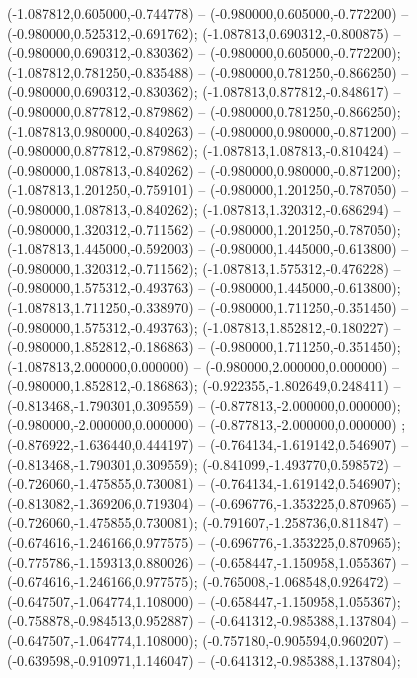  (-1.087812,0.605000,-0.744778) -- (-0.980000,0.605000,-0.772200) -- (-0.980000,0.525312,-0.691762);
 (-1.087813,0.690312,-0.800875) -- (-0.980000,0.690312,-0.830362) -- (-0.980000,0.605000,-0.772200);
 (-1.087812,0.781250,-0.835488) -- (-0.980000,0.781250,-0.866250) -- (-0.980000,0.690312,-0.830362);
 (-1.087813,0.877812,-0.848617) -- (-0.980000,0.877812,-0.879862) -- (-0.980000,0.781250,-0.866250);
 (-1.087813,0.980000,-0.840263) -- (-0.980000,0.980000,-0.871200) -- (-0.980000,0.877812,-0.879862);
 (-1.087813,1.087813,-0.810424) -- (-0.980000,1.087813,-0.840262) -- (-0.980000,0.980000,-0.871200);
 (-1.087813,1.201250,-0.759101) -- (-0.980000,1.201250,-0.787050) -- (-0.980000,1.087813,-0.840262);
 (-1.087813,1.320312,-0.686294) -- (-0.980000,1.320312,-0.711562) -- (-0.980000,1.201250,-0.787050);
 (-1.087813,1.445000,-0.592003) -- (-0.980000,1.445000,-0.613800) -- (-0.980000,1.320312,-0.711562);
 (-1.087813,1.575312,-0.476228) -- (-0.980000,1.575312,-0.493763) -- (-0.980000,1.445000,-0.613800);
 (-1.087813,1.711250,-0.338970) -- (-0.980000,1.711250,-0.351450) -- (-0.980000,1.575312,-0.493763);
 (-1.087813,1.852812,-0.180227) -- (-0.980000,1.852812,-0.186863) -- (-0.980000,1.711250,-0.351450);
 (-1.087813,2.000000,0.000000) -- (-0.980000,2.000000,0.000000) -- (-0.980000,1.852812,-0.186863);
 (-0.922355,-1.802649,0.248411) -- (-0.813468,-1.790301,0.309559) -- (-0.877813,-2.000000,0.000000);
 (-0.980000,-2.000000,0.000000) -- (-0.877813,-2.000000,0.000000) ;
 (-0.876922,-1.636440,0.444197) -- (-0.764134,-1.619142,0.546907) -- (-0.813468,-1.790301,0.309559);
 (-0.841099,-1.493770,0.598572) -- (-0.726060,-1.475855,0.730081) -- (-0.764134,-1.619142,0.546907);
 (-0.813082,-1.369206,0.719304) -- (-0.696776,-1.353225,0.870965) -- (-0.726060,-1.475855,0.730081);
 (-0.791607,-1.258736,0.811847) -- (-0.674616,-1.246166,0.977575) -- (-0.696776,-1.353225,0.870965);
 (-0.775786,-1.159313,0.880026) -- (-0.658447,-1.150958,1.055367) -- (-0.674616,-1.246166,0.977575);
 (-0.765008,-1.068548,0.926472) -- (-0.647507,-1.064774,1.108000) -- (-0.658447,-1.150958,1.055367);
 (-0.758878,-0.984513,0.952887) -- (-0.641312,-0.985388,1.137804) -- (-0.647507,-1.064774,1.108000);
 (-0.757180,-0.905594,0.960207) -- (-0.639598,-0.910971,1.146047) -- (-0.641312,-0.985388,1.137804);
